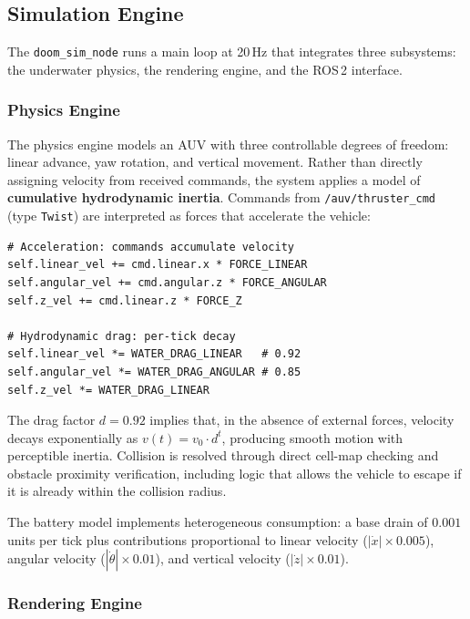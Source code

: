 \documentclass[10pt,twocolumn,letterpaper]{article}
\begin{document}
\subsection{Simulation Engine}

The \texttt{doom\_sim\_node} runs a main loop at 20\,Hz that integrates three subsystems: the underwater physics, the rendering engine, and the ROS\,2 interface.

\subsubsection{Physics Engine}

The physics engine models an AUV with three controllable degrees of freedom: linear advance, yaw rotation, and vertical movement. Rather than directly assigning velocity from received commands, the system applies a model of \textbf{cumulative hydrodynamic inertia}. Commands from \texttt{/auv/thruster\_cmd} (type \texttt{Twist}) are interpreted as forces that accelerate the vehicle:

\begin{lstlisting}[caption={Acceleration and hydrodynamic drag model.}, label={lst:physics}]
# Acceleration: commands accumulate velocity
self.linear_vel += cmd.linear.x * FORCE_LINEAR
self.angular_vel += cmd.angular.z * FORCE_ANGULAR
self.z_vel += cmd.linear.z * FORCE_Z

# Hydrodynamic drag: per-tick decay
self.linear_vel *= WATER_DRAG_LINEAR   # 0.92
self.angular_vel *= WATER_DRAG_ANGULAR # 0.85
self.z_vel *= WATER_DRAG_LINEAR
\end{lstlisting}

The drag factor $d = 0.92$ implies that, in the absence of external forces, velocity decays exponentially as $v(t) = v_0 \cdot d^t$, producing smooth motion with perceptible inertia. Collision is resolved through direct cell-map checking and obstacle proximity verification, including logic that allows the vehicle to escape if it is already within the collision radius.

The battery model implements heterogeneous consumption: a base drain of $0.001$ units per tick plus contributions proportional to linear velocity ($|\dot{x}| \times 0.005$), angular velocity ($|\dot{\theta}| \times 0.01$), and vertical velocity ($|\dot{z}| \times 0.01$).

\subsubsection{Rendering Engine}
\end{document}
